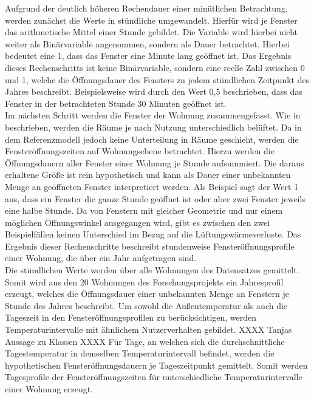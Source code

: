 Aufgrund der deutlich höheren Rechendauer einer minütlichen Betrachtung, werden zunächst die Werte in stündliche umgewandelt. 
Hierfür wird je Fenster das arithmetische Mittel einer Stunde gebildet.
Die Variable wird hierbei nicht weiter als Binärvariable angenommen, sondern als Dauer betrachtet.
Hierbei bedeutet eine 1, dass das Fenster eine Minute lang geöffnet ist.
Das Ergebnis dieses Rechenschritts ist keine Binärvariable, sondern eine reelle Zahl zwischen 0 und 1, welche die Öffnungsdauer des Fensters zu jedem stündlichen Zeitpunkt des Jahres beschreibt.
Beispielsweise wird durch den Wert 0,5 beschrieben, dass das Fenster in der betrachteten Stunde 30 Minuten geöffnet ist.\\
Im nächsten Schritt werden die Fenster der Wohnung zusammengefasst.
Wie in \cite{Osterhage.2018} beschrieben, werden die Räume je nach Nutzung unterschiedlich belüftet.
Da in dem Referenzmodell jedoch keine Unterteilung in Räume geschieht, werden die Fensteröffnungszeiten auf Wohnungsebene betrachtet.
Hierzu werden die Öffnungsdauern aller Fenster einer Wohnung je Stunde aufsummiert.
Die daraus erhaltene Größe ist rein hypothetisch und kann als Dauer einer unbekannten Menge an geöffneten Fenster interpretiert werden.
Als Beispiel sagt der Wert 1 aus, dass ein Fenster die ganze Stunde geöffnet ist oder aber zwei Fenster jeweils eine halbe Stunde.
Da von Fenstern mit gleicher Geometrie und nur einem möglichen Öffnungswinkel ausgegangen wird, gibt es zwischen den zwei Beispielfällen keinen Unterschied im Bezug auf die Lüftungswärmeverluste.
Das Ergebnis dieser Rechenschritte beschreibt stundenweise Fensteröffnungsprofile einer Wohnung, die über ein Jahr aufgetragen sind.\\
Die stündlichen Werte werden über alle Wohnungen des Datensatzes gemittelt.
Somit wird aus den 20 Wohnungen des Forschungsprojekts ein Jahresprofil erzeugt, welches die Öffnungsdauer einer unbekannten Menge an Fenstern je Stunde des Jahres beschreibt.
Um sowohl die Außentemperatur als auch die Tageszeit in den Fensteröffnungsprofilen zu berücksichtigen, werden Temperaturintervalle mit ähnlichem Nutzerverhalten gebildet. XXXX Tanjas Aussage zu Klassen XXXX
Für Tage, an welchen sich die durchschnittliche Tagestemperatur in demselben Temperaturintervall befindet, werden die hypothetischen Fensteröffnungsdauern je Tageszeitpunkt gemittelt.
Somit werden Tagesprofile der Fensteröffnungszeiten für unterschiedliche Temperaturintervalle einer Wohnung erzeugt.

